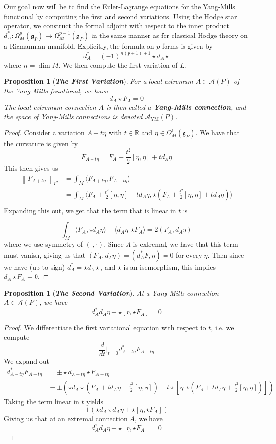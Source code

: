 \documentclass[psamsfonts, 12pt]{amsart}
\newtheorem{prop}[thm]{Proposition}
\theoremstyle{definition}
\theoremstyle{remark}
\newcommand{\R}{\mathbb{R}}
\newcommand{\ib}[1]{\textbf{\textit{#1}}}
\newcommand{\g}{\mathfrak{g}}
\newcommand{\norm}[1]{\left\lVert#1\right\rVert}
\begin{document}
Our goal now will be to find the Euler-Lagrange
equations for the Yang-Mills functional by computing the first and second variations.
Using the Hodge star operator, we construct the formal adjoint with respect to
the inner product $d_A^* : \Omega^{p}_M(\g_P) \to \Omega^{p-1}_M(\g_P)$ in the same manner
as for classical Hodge theory on a Riemannian manifold. Explicitly, the formula
on $p$-forms is given by
\[
d^*_A = (-1)^{n(p+1) + 1}\star d_A \star
\]
where $n = \dim M$. We then compute the first variation of $L$.
%
\begin{prop}[\ib{The First Variation}]
For a local extremum $A \in \mathscr{A}(P)$ of the Yang-Mills functional, we have
\[
d_A\star F_A = 0
\]
The local extremum connection $A$ is then called a \ib{Yang-Mills connection}, and the
space of Yang-Mills connections is denoted $\mathscr{A}_{\mathrm{YM}}(P)$.
\end{prop}
%
\begin{proof}
Consider a variation $A + t\eta$ with $t \in \R$ and $\eta \in \Omega^1_M(\g_P)$.
We have that the curvature is given by
\[
F_{A+t\eta} = F_A + \frac{t^2}{2}[\eta,\eta] + td_A\eta
\]
This then gives us
\begin{align*}
\norm{F_{A+t\eta}}_{L^2} &= \int_M \langle F_{A+t\eta},F_{A+t\eta}\rangle \\
&= \int_M \langle F_A + \frac{t^2}{2}[\eta,\eta]
+ td_A\eta,\star (F_A + \frac{t^2}{2}[\eta,\eta] + td_A\eta)\rangle \\
\end{align*}
Expanding this out, we get that the term that is linear in $t$ is

\[
\int_M \langle F_A, \star d_A\eta\rangle + \langle d_A\eta, \star F_A \rangle
= 2(F_A,d_A\eta)
\]
where we use symmetry of $(\cdot,\cdot)$. Since $A$ is extremal, we have that
this term must vanish, giving us that $(F_A,d_A\eta) = (d^*_A F,\eta) = 0$ for
every $\eta$. Then since we have (up to sign) $d^*_A = \star d_A \star$, and
$\star$ is an isomorphism, this implies $d_A\star F_A = 0$.
\end{proof}
%
\begin{prop}[\ib{The Second Variation}]
At a Yang-Mills connection $A \in \mathscr{A}(P)$, we have
\[
d^*_A d_A\eta + \star[\eta,\star F_A] = 0
\]
\end{prop}
%
\begin{proof}
We differentiate the first variational equation with respect to $t$, i.e.
we compute
\[
\frac{d}{dt}\bigg\vert_{t=0} d_{A+t\eta}^*F_{A+t\eta}
\]
We expand out
\begin{align*}
d_{A+t\eta}^*F_{A+t\eta} &= \pm \star d_{A+t\eta}\star F_{A+t\eta} \\
&= \pm\left(\star d_A\star\left(F_A + td_A\eta + \frac{t^2}{2}[\eta,\eta]\right)
+ t\star
\left[\eta, \star\left(F_A + td_A\eta + \frac{t^2}{2}[\eta,\eta]\right)\right]\right)
\end{align*}
Taking the term linear in $t$ yields
\[
\pm\left( \star d_A\star d_A\eta + \star[\eta,\star F_A] \right)
\]
Giving us that at an extremal connection $A$, we have
\[
d^*_A d_A\eta + \star[\eta,\star F_A] = 0
\]
\end{proof}
%
%
\end{document}
